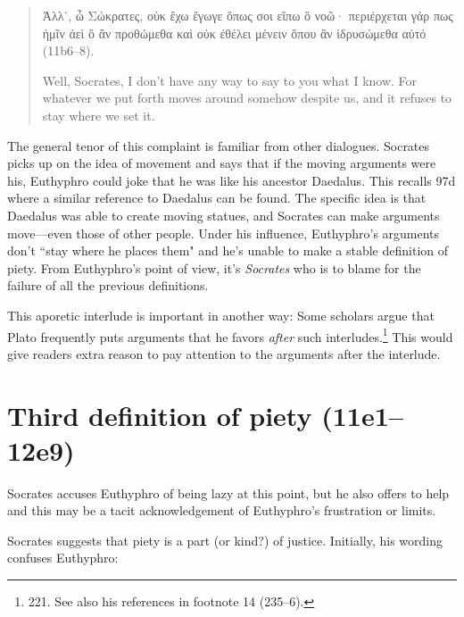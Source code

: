 \documentclass[11pt]{article}
\begin{document}
\begin{quote}

    {\g
    Ἀλλ᾽, ὦ Σώκρατες, οὐκ ἔχω ἔγωγε ὅπως σοι εἴπω ὃ νοῶ· περιέρχεται γάρ
    πως ἡμῖν ἀεὶ ὃ ἂν προθώμεθα καὶ οὐκ ἐθέλει μένειν ὅπου ἂν ἱδρυσώμεθα
    αὐτό
    } (11b6--8).

    Well, Socrates, I don't have any way to say to you what I know.  For
    whatever we put forth moves around somehow despite us, and it refuses
    to stay where we set it.

\end{quote}

The general tenor of this complaint is familiar from other dialogues.
Socrates picks up on the idea of movement and says that if the moving
arguments were his, Euthyphro could joke that he was like his ancestor
Daedalus.  This recalls  97d where a similar reference to
Daedalus can be found.  The specific idea is that Daedalus was able to
create moving statues, and Socrates can make arguments move---even those
of other people.  Under his influence, Euthyphro's arguments don't ``stay
where he places them" and he's unable to make a stable definition of piety.
From Euthyphro's point of view, it's \emph{Socrates} who is to blame for
the failure of all the previous definitions.

This aporetic interlude is important in another way: Some scholars argue
that Plato frequently puts arguments that he favors \emph{after} such
interludes.\footnote{\citet{mcpherran1992} 221.  See also his references in
footnote 14 (235--6).}  This would give readers extra reason to pay
attention to the arguments after the interlude.


\section{Third definition of piety (11e1--12e9)}

Socrates accuses Euthyphro of being lazy at this point, but he also offers
to help and this may be a tacit acknowledgement of Euthyphro's frustration
or limits.

Socrates suggests that piety is a part (or kind?) of justice.  Initially,
his wording confuses Euthyphro:
\end{document}
